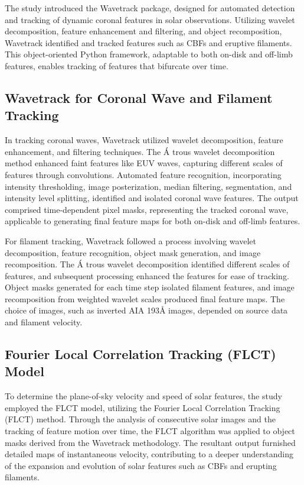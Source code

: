 The study introduced the Wavetrack package, designed for automated detection and tracking of dynamic coronal features in solar observations. Utilizing wavelet decomposition, feature enhancement and filtering, and object recomposition, Wavetrack identified and tracked features such as CBFs and eruptive filaments. This object-oriented Python framework, adaptable to both on-disk and off-limb features, enables tracking of features that bifurcate over time.

\subsection{Wavetrack for Coronal Wave and Filament Tracking}
In tracking coronal waves, Wavetrack utilized wavelet decomposition, feature enhancement, and filtering techniques. The \'A trous wavelet decomposition method enhanced faint features like EUV waves, capturing different scales of features through convolutions. Automated feature recognition, incorporating intensity thresholding, image posterization, median filtering, segmentation, and intensity level splitting, identified and isolated coronal wave features. The output comprised time-dependent pixel masks, representing the tracked coronal wave, applicable to generating final feature maps for both on-disk and off-limb features.

For filament tracking, Wavetrack followed a process involving wavelet decomposition, feature recognition, object mask generation, and image recomposition. The \'A trous wavelet decomposition identified different scales of features, and subsequent processing enhanced the features for ease of tracking. Object masks generated for each time step isolated filament features, and image recomposition from weighted wavelet scales produced final feature maps. The choice of images, such as inverted AIA 193Å images, depended on source data and filament velocity.

\subsection{Fourier Local Correlation Tracking (FLCT) Model}
To determine the plane-of-sky velocity and speed of solar features, the study employed the FLCT model, utilizing the Fourier Local Correlation Tracking (FLCT) method. Through the analysis of consecutive solar images and the tracking of feature motion over time, the FLCT algorithm was applied to object masks derived from the Wavetrack methodology. The resultant output furnished detailed maps of instantaneous velocity, contributing to a deeper understanding of the expansion and evolution of solar features such as CBFs and erupting filaments.

